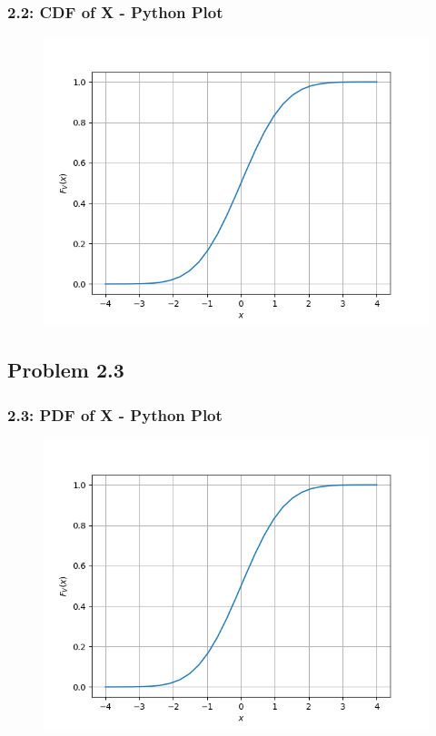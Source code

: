 \documentclass{beamer}
\begin{document}
\begin{frame}
	\frametitle{2.2: CDF of X - Python Plot}
	\begin{figure}
		\centerline{\includegraphics[width=\textheight]{../figs/gau_cdf.png}}
		\label{fig2}
	\end{figure}
	
\end{frame}	

\subsection{Problem 2.3}

\begin{frame}
	\frametitle{2.3: PDF of X - Python Plot}
	\begin{figure}
		\centerline{\includegraphics[width=\textheight]{../figs/gau_cdf.png}}
		\label{fig3}
	\end{figure}
	
\end{frame}
\end{document}
